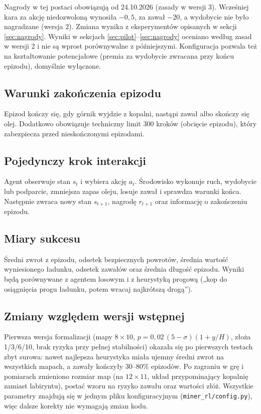 \documentclass[11pt,a4paper]{article}
\begin{document}
Nagrody w tej postaci obowiązują od 24.10.2026 (zasady w wersji 3). Wcześniej
kara za akcję niedozwoloną wynosiła $-0{,}5$, za zawał $-20$, a wydobycie nie było
nagradzane (wersja 2). Zmiana wynika z eksperymentów opisanych w sekcji
\ref{sec:nagrody}. Wyniki w sekcjach \ref{sec:pilot}--\ref{sec:nagrody} oceniano
według zasad w wersji 2 i nie są wprost porównywalne z późniejszymi. Konfiguracja
pozwala też na kształtowanie potencjałowe (premia za wydobycie zwracana przy końcu
epizodu), domyślnie wyłączone.

\subsection{Warunki zakończenia epizodu}
Epizod kończy się, gdy górnik wyjdzie z kopalni, nastąpi zawał albo skończy się
olej. Dodatkowo obowiązuje techniczny limit 300 kroków (obcięcie epizodu),
który zabezpiecza przed nieskończonymi epizodami.

\subsection{Pojedynczy krok interakcji}
Agent obserwuje stan $s_t$ i wybiera akcję $a_t$. Środowisko wykonuje ruch,
wydobycie lub podparcie, zmniejsza zapas oleju, losuje zawał i sprawdza warunki
końca. Następnie zwraca nowy stan $s_{t+1}$, nagrodę $r_{t+1}$ oraz informację
o zakończeniu epizodu.

\subsection{Miary sukcesu}
Średni zwrot z epizodu, odsetek bezpiecznych powrotów, średnia wartość
wyniesionego ładunku, odsetek zawałów oraz średnia długość epizodu. Wyniki będą
porównywane z agentem losowym i z heurystyką progową („kop do osiągnięcia progu
ładunku, potem wracaj najkrótszą drogą”).

\subsection{Zmiany względem wersji wstępnej}
Pierwsza wersja formalizacji (mapy $8\times 10$, $p = 0{,}02\,(5-\sigma)(1+y/H)$,
złoża 1/3/6/10, brak ryzyka przy pełnej stabilności) okazała się po pierwszych
testach zbyt surowa: nawet najlepsza heurystyka miała ujemny średni zwrot na
wszystkich mapach, a zawały kończyły 30--80\% epizodów. Po zagraniu w grę
i pomiarach zmieniono rozmiar map (na $12\times 11$, układ przypominający
kopalnię zamiast labiryntu), postać wzoru na ryzyko zawału oraz wartości złóż.
Wszystkie parametry znajdują się w jednym pliku konfiguracyjnym
(\texttt{miner\_rl/config.py}), więc dalsze korekty nie wymagają zmian kodu.
\end{document}
